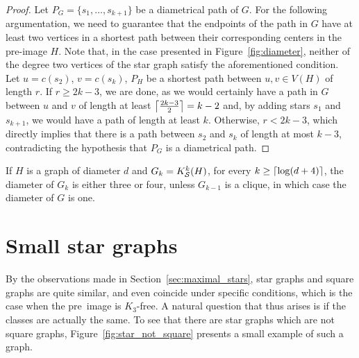 \begin{proof}
    Let $P_G = \{s_1, \dots, s_{k+1}\}$ be a diametrical path of $G$. %
    For the following argumentation, we need to guarantee that the endpoints of the path in $G$ have at least two vertices in a shortest path between their corresponding centers in the pre-image $H$.
    Note that, in the case presented in Figure~\ref{fig:diameter}, neither of the degree two vertices of the star graph satisfy the aforementioned condition.
    Let $u = c(s_2)$, $v = c(s_k)$, $P_H$ be a shortest path between $u, v \in V(H)$ of length $r$.
    If $r \geq 2k - 3$, we are done, as we would certainly have a path in $G$ between $u$ and $v$ of length at least $\left\lceil\frac{2k-3}{2}\right\rceil = k-2$ and, by adding stars $s_1$ and $s_{k+1}$, we would have a path of length at least $k$.
    Otherwise, $r < 2k - 3$, which directly implies that there is a path between $s_2$ and $s_k$ of length at most $k-3$, contradicting the hypothesis that $P_G$ is a diametrical path.
\end{proof}

\begin{corollary}
	If $H$ is a graph of diameter $d$ and $G_k = K_{\mathcal{S}}^k(H)$, for every $k \geq \left\lceil\log (d + 4)\right\rceil$, the diameter of $G_k$ is either three or four, unless $G_{k-1}$ is a clique, in which case the diameter of $G$ is one.
\end{corollary}

\section{Small star graphs}


By the observations made in Section~\ref{sec:maximal_stars}, star graphs and square graphs are quite similar, and even coincide under specific conditions, which is the case when the pre~image is $K_3$-free.
A natural question that thus arises is if the classes are actually the same.
To see that there are star graphs which are not square graphs, Figure~\ref{fig:star_not_square} presents a small example of such a graph.

